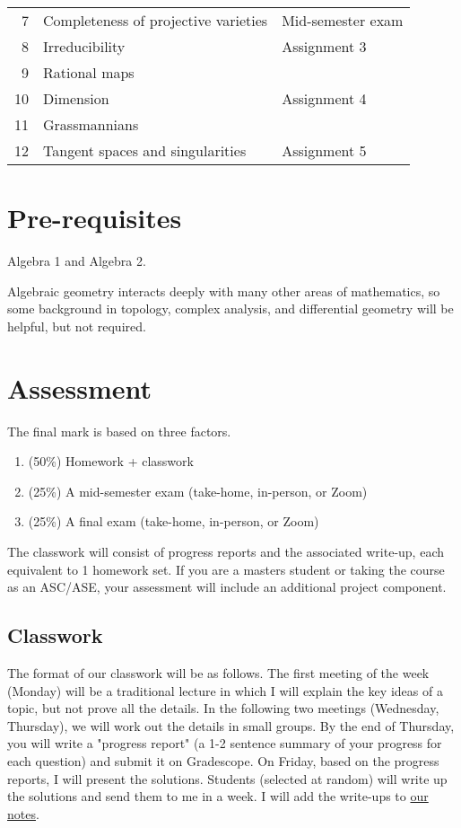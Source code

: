 \documentclass[11pt]{article}
\begin{document}
\begin{center}
\begin{tabular}{rll}
7 & Completeness of projective varieties & Mid-semester exam\\
8 & Irreducibility & Assignment 3\\
9 & Rational maps & \\
10 & Dimension & Assignment 4\\
11 & Grassmannians & \\
12 & Tangent spaces and singularities & Assignment 5\\
\hline
\end{tabular}
\end{center}

\section{Pre-requisites}
\label{sec:org91baec6}
Algebra 1 and Algebra 2.

Algebraic geometry interacts deeply with many other areas of mathematics, so some background in topology, complex analysis, and differential geometry will be helpful, but not required. 

\section{Assessment}
\label{sec:org64cef45}
The final mark is based on three factors.
\begin{enumerate}
\item (50\%) Homework + classwork
\item (25\%) A mid-semester exam (take-home, in-person, or Zoom)
\item (25\%) A final exam (take-home, in-person, or Zoom)
\end{enumerate}
The classwork will consist of progress reports and the associated write-up, each equivalent to 1 homework set.
If you are a masters student or taking the course as an ASC/ASE, your assessment will include an additional project component.

\subsection{Classwork}
\label{sec:org549d3e5}
The format of our classwork will be as follows. The first meeting of the week (Monday) will be a traditional lecture in which I will explain the key ideas of a topic, but not prove all the details. In the following two meetings (Wednesday, Thursday), we will work out the details in small groups. By the end of Thursday, you will write a "progress report" (a 1-2 sentence summary of your progress for each question) and submit it on Gradescope. On Friday, based on the progress reports, I will present the solutions. Students (selected at random) will write up the solutions and send them to me in a week. I will add the write-ups to \href{notes}{our notes}. 
\end{document}
